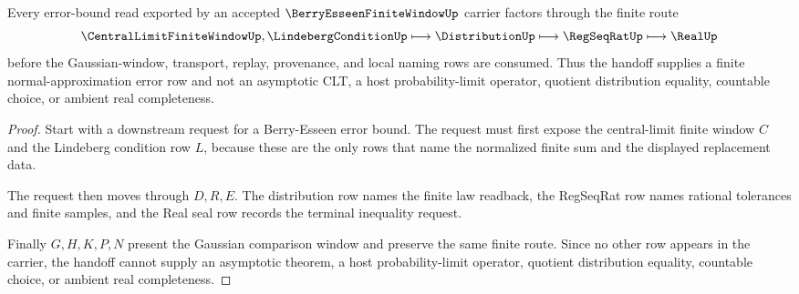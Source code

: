 \begin{theorem}
\label{thm:berry-esseen-error-bound-handoff}
Every error-bound read exported by an accepted $\BerryEsseenFiniteWindowUp$ carrier factors through the finite route
$$
\CentralLimitFiniteWindowUp,\LindebergConditionUp \longmapsto \DistributionUp \longmapsto \RegSeqRatUp \longmapsto \RealUp
$$
before the Gaussian-window, transport, replay, provenance, and local naming rows are consumed. Thus the handoff supplies a finite normal-approximation error row and not an asymptotic CLT, a host probability-limit operator, quotient distribution equality, countable choice, or ambient real completeness.
\end{theorem}
\begin{proof}
Start with a downstream request for a Berry-Esseen error bound. The request must first expose the central-limit finite window $C$ and the Lindeberg condition row $L$, because these are the only rows that name the normalized finite sum and the displayed replacement data.

The request then moves through $D,R,E$. The distribution row names the finite law readback, the RegSeqRat row names rational tolerances and finite samples, and the Real seal row records the terminal inequality request.

Finally $G,H,K,P,N$ present the Gaussian comparison window and preserve the same finite route. Since no other row appears in the carrier, the handoff cannot supply an asymptotic theorem, a host probability-limit operator, quotient distribution equality, countable choice, or ambient real completeness.
\end{proof}

